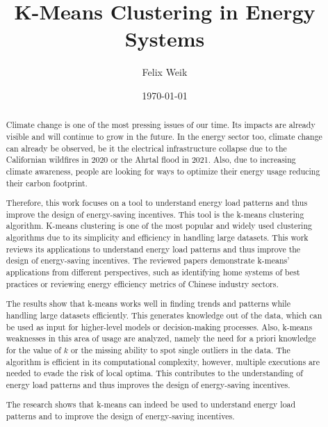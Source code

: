 \documentclass{revtex4-2}
\begin{document}
\title{K-Means Clustering in Energy Systems}
\author{Felix Weik}
\date{\today}


\begin{abstract}
Climate change is one of the most pressing issues of our time. 
Its impacts are already visible and will continue to grow in the future.
In the energy sector too, climate change can already be observed, be it the electrical infrastructure collapse due to the Californian wildfires in 2020 or the Ahrtal flood in 2021.
Also, due to increasing climate awareness, people are looking for ways to optimize their energy usage reducing their carbon footprint.

Therefore, this work focuses on a tool to understand energy load patterns and thus improve the design of energy-saving incentives.
This tool is the k-means clustering algorithm.
K-means clustering is one of the most popular and widely used clustering algorithms due to its simplicity and efficiency in handling large datasets.
This work reviews its applications to understand energy load patterns and thus improve the design of energy-saving incentives.
The reviewed papers demonstrate k-means' applications from different perspectives, such as identifying home systems of best practices or reviewing energy efficiency metrics of Chinese industry sectors.

The results show that k-means works well in finding trends and patterns while handling large datasets efficiently.
This generates knowledge out of the data, which can be used as input for higher-level models or decision-making processes.
Also, k-means weaknesses in this area of usage are analyzed, namely the need for a priori knowledge for the value of $k$ or the missing ability to spot single outliers in the data.
The algorithm is efficient in its computational complexity, however, multiple executions are needed to evade the risk of local optima.
This contributes to the understanding of energy load patterns and thus improves the design of energy-saving incentives.

The research shows that k-means can indeed be used to understand energy load patterns and to improve the design of energy-saving incentives.
\end{abstract}
\end{document}
